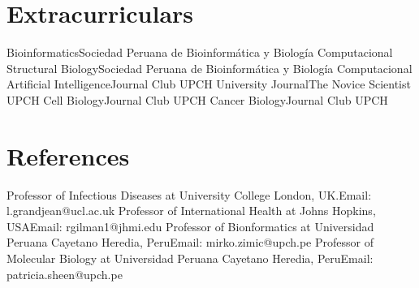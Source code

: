\documentclass[11pt,a4paper,sans]{moderncv}
\begin{document}
\section{Extracurriculars}

    {Bioinformatics}{Sociedad Peruana de Bioinformática y Biología Computacional}{}
    {}
    {Structural Biology}{Sociedad Peruana de Bioinformática y Biología Computacional}{}
    {}
    {Artificial Intelligence}{Journal Club UPCH}{}
    {}
    {University Journal}{The Novice Scientist UPCH}{}
    {}
    {Cell Biology}{Journal Club UPCH}{}
    {}
    {Cancer Biology}{Journal Club UPCH}{}
    {}
  

\section{References}
    {Professor of Infectious Diseases at University College London, UK.}{Email: l.grandjean@ucl.ac.uk}{}
    {}
    {Professor of International Health at Johns Hopkins, USA}{Email: rgilman1@jhmi.edu}{}
    {}
    {Professor of Bionformatics at Universidad Peruana Cayetano Heredia, Peru}{Email: mirko.zimic@upch.pe}{}
    {}
    {Professor of Molecular Biology at Universidad Peruana Cayetano Heredia, Peru}{Email: patricia.sheen@upch.pe}{}
    {}

\end{document}
